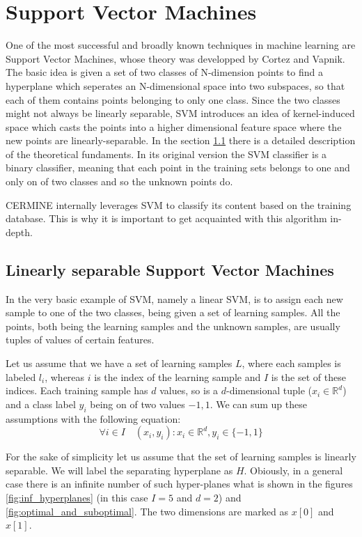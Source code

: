 \section{Support Vector Machines}\label{sec:svm}
One of the most successful and broadly known techniques in machine learning are Support Vector Machines, whose theory was developped by Cortez and Vapnik. The basic idea is given a set of two classes of N-dimension points to find a hyperplane which seperates an N-dimensional space into two subspaces, so that each of them contains points belonging to only one class. Since the two classes might not always be linearly separable, SVM introduces an idea of kernel-induced space which casts the points into a higher dimensional feature space where the new points are linearly-separable. In the section \ref{subsec:linear_svm} there is a detailed description of the theoretical fundaments. In its original version the SVM classifier is a binary classifier, meaning that each point in the training sets belongs to one and only on of two classes and so the unknown points do.

CERMINE internally leverages SVM to classify its content based on the training database. This is why it is important to get acquainted with this algorithm in-depth. 

\subsection{Linearly separable Support Vector Machines}
\label{subsec:linear_svm}
In the very basic example of SVM, namely a linear SVM, is to assign each new sample to one of the two classes, being given a set of learning samples. All the points, both being the learning samples and the unknown samples, are usually tuples of values of certain features.

Let us assume that we have a set of learning samples $L$, where each samples is labeled $l_i$, whereas $i$ is the index of the learning sample and $I$ is the set of these indices. Each training sample has $d$ values, so is a $d$-dimensional tuple ($x_i \in \mathbb{R}^d$) and a class label $y_i$ being on of two values ${-1, 1}$. We can sum up these assumptions with the following equation:
\begin{equation}
\forall{i \in I} \quad \left(x_i, y_i\right) : x_i \in \mathbb{R}^d, y_i \in \{-1, 1\}
\end{equation} 

For the sake of simplicity let us assume that the set of learning samples is linearly separable. We will label the separating hyperplane as $H$. Obiously, in a general case there is an infinite number of such hyper-planes what is shown in the figures \ref{fig:inf_hyperplanes} (in this case $I=5$ and $d=2$) and \ref{fig:optimal_and_suboptimal}. The two dimensions are marked as $x[0]$ and $x[1]$.


